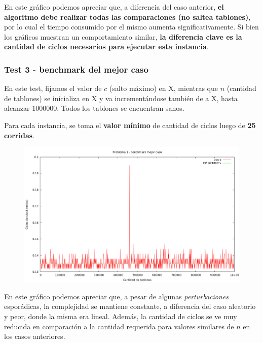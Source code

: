 \vspace*{0.5cm}

En este gráfico podemos apreciar que, a diferencia del caso anterior, \textbf{el algoritmo debe realizar todas
las comparaciones (no saltea tablones)}, por lo cual el tiempo consumido por el mismo aumenta significativamente. 
Si bien los gráficos muestran un comportamiento similar, \textbf{la diferencia clave es la cantidad de ciclos 
necesarios para ejecutar esta instancia}.


\newpage


\subsubsection{Test 3 - benchmark del mejor caso}

En este test, fijamos el valor de $c$ (salto máximo) en X, mientras que $n$ (cantidad de tablones) 
se inicializa en X y va incrementándose también de a X, hasta alcanzar 1000000. Todos los 
tablones se encuentran sanos.

Para cada instancia, se toma el \textbf{valor mínimo} de cantidad de ciclos luego de \textbf{25 corridas}.


\begin{figure}[h]
  \begin{center}
    \includegraphics[scale=0.35]{imagenes/grafico-1-mejor.png}
  \end{center}
\end{figure}


En este gráfico podemos apreciar que, a pesar de algunas \textit{perturbaciones} esporádicas, la complejidad 
se mantiene constante, a diferencia del caso aleatorio y peor, donde la misma era lineal. Además, la cantidad de 
ciclos se ve muy reducida en comparación a la cantidad requerida para valores similares de $n$ en los casos anteriores.


